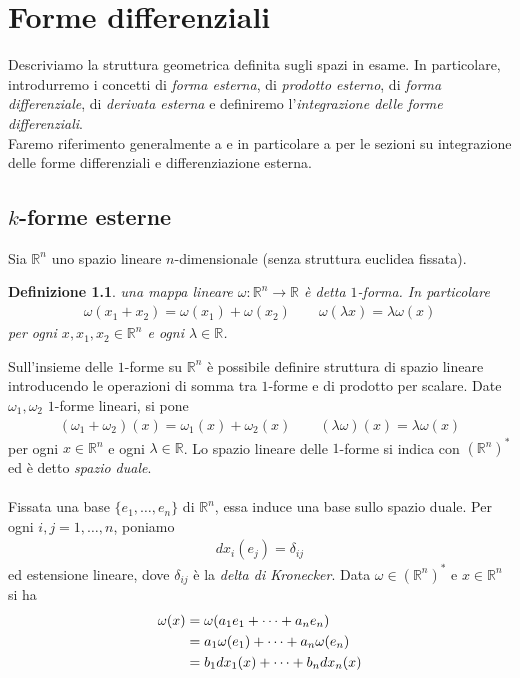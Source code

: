 \documentclass[twoside, 11pt]{amsbook}
\newcommand{\0}{{(0)}}
\newcommand{\3}{{(3)}}
\theoremstyle{colonplain}
\theoremstyle{colondefinition}
\newtheorem{defn}[thm]{Definizione}
\theoremstyle{colonremark}
\numberwithin{equation}{chapter}
\begin{document}
\chapter{Forme differenziali}
Descriviamo la struttura geometrica definita sugli spazi in esame. In particolare, introdurremo i concetti di \textit{forma esterna}, di \textit{prodotto esterno}, di \textit{forma differenziale}, di \textit{derivata esterna} e definiremo l'\textit{integrazione delle forme differenziali}. \\
Faremo riferimento generalmente a \cite{Arnold} e in particolare a \cite{Lee} per le sezioni su integrazione delle forme differenziali e differenziazione esterna.
\section{$k$-forme esterne}
Sia $\mathbb{R}^n$ uno spazio lineare $n$-dimensionale (senza struttura euclidea fissata).
\begin{defn} una mappa lineare $\omega : \mathbb{R}^n \longrightarrow \mathbb{R}$ è detta $1$-\textit{forma}. In particolare 
\begin{align}
    \omega(x_1 + x_2) = \omega(x_1) + \omega(x_2) \qquad \omega(\lambda x) = \lambda\omega(x) 
\end{align}
per ogni $x, x_1, x_2 \in \mathbb{R}^n$ e ogni $\lambda \in \mathbb{R}$.
\end{defn}
Sull'insieme delle $1$-forme su $\mathbb{R}^n$ è possibile definire struttura di spazio lineare introducendo le operazioni di somma tra $1$-forme e di prodotto per scalare. Date $\omega_1, \omega_2$ $1$-forme lineari, si pone 
\begin{align}
    (\omega_1 + \omega_2)(x) = \omega_1(x) + \omega_2(x) \qquad (\lambda\omega)(x) = \lambda\omega(x) 
\end{align}
per ogni $x \in \mathbb{R}^n$ e ogni $\lambda \in \mathbb{R}$. Lo spazio lineare delle $1$-forme si indica con $(\mathbb{R}^n)^*$ ed è detto \textit{spazio duale}. \\ \\
Fissata una base $\{e_1, \dots, e_n\}$ di $\mathbb{R}^n$, essa induce una base sullo spazio duale. Per ogni $i, j = 1, \dots, n$, poniamo
\begin{align}
    dx_i(e_j) = \delta_{ij} 
\end{align}
ed estensione lineare, dove $\delta_{ij}$ è la \textit{delta di Kronecker}. Data $\omega \in (\mathbb{R}^n)^*$ e $x \in \mathbb{R}^n$ si ha 
\begin{align}
    \omega(x) &= \omega(a_1e_1 + \dots + a_ne_n) \notag \\
    &= a_1\omega(e_1) + \dots + a_n\omega(e_n) \notag \\
    &= b_1dx_1(x) + \dots + b_ndx_n(x) \notag
\end{align}
\end{document}

